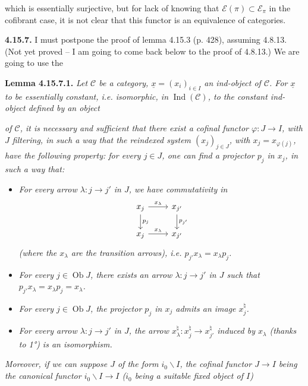 \documentclass[11pt]{article}
\newcommand{\printedpage}[1]{\marginpar{\footnotesize p.~#1}}
\newcommand{\msp}[1]{\marginpar{\footnotesize [#1]}}
\newcommand{\ux}{\underline{x}}
\newcommand{\cC}{\mathcal{C}}
\newcommand{\Ob}{\operatorname{Ob}}
\newcommand{\Ind}{\operatorname{Ind}}
\begin{document}
\setcounter{footnote}{183}

\printedpage{169}
which is essentially surjective, but for lack of knowing that $\mathcal{E}(\pi) \subset \mathcal{E}_\pi$ in the cofibrant case, it is not clear that this functor is an equivalence of categories.

\textbf{4.15.7.} I must postpone the proof of lemma 4.15.3 (p. 428), assuming 4.8.13. (Not yet proved -- I am going to come back below to the proof of 4.8.13.) We are going to use the

\textbf{Lemma 4.15.7.1.} \textit{Let $\cC$ be a category, $\ux = (x_i)_{i\in I}$ an ind-object of $\cC$. For $\ux$ to be essentially constant, i.e. isomorphic, in} $\Ind(\cC)$\textit{, to the constant ind-object defined by an object}

\msp{page 441}
\textit{of $\cC$, it is necessary and sufficient that there exist a cofinal functor $\varphi : J \longrightarrow I$, with $J$ filtering, in such a way that the reindexed system $(x_j)_{j\in J}$, with $x_j = x_{\varphi(j)}$, have the following property: for every $j \in J$, one can find a projector $p_j$ in $x_j$, in such a way that:}
\begin{itemize}
\item[\textit{1°)}] \textit{For every arrow $\lambda : j \longrightarrow j'$ in $J$, we have commutativity in}
\[
\begin{tikzcd}
x_j \arrow[r, "x_\lambda"] \arrow[d, "p_j"] & x_{j'} \arrow[d, "p_{j'}"] \\
x_j \arrow[r, "x_\lambda"] & x_{j'}
\end{tikzcd}
\]
\textit{(where the $x_\lambda$ are the transition arrows), i.e. $p_{j'}x_\lambda = x_\lambda p_j$.}
\item[\textit{2°)}] \textit{For every $j \in \Ob J$, there exists an arrow $\lambda : j \longrightarrow j'$ in $J$ such that $p_{j'}x_\lambda = x_\lambda p_j = x_\lambda$.}
\item[\textit{3°)}] \textit{For every $j \in \Ob J$, the projector $p_j$ in $x_j$ admits an image $x_j^\natural$.} %
\item[\textit{4°)}] \textit{For every arrow $\lambda : j \longrightarrow j'$ in $J$, the arrow $x_\lambda^\natural : x_j^\natural \longrightarrow x_{j'}^\natural$ induced by $x_\lambda$ (thanks to 1°) is an isomorphism.}
\end{itemize}
\textit{Moreover, if we can suppose $J$ of the form $i_0\backslash I$, the cofinal functor $J \longrightarrow I$ being the canonical functor $i_0\backslash I \longrightarrow I$ ($i_0$ being a suitable fixed object of $I$)}
\end{document}
